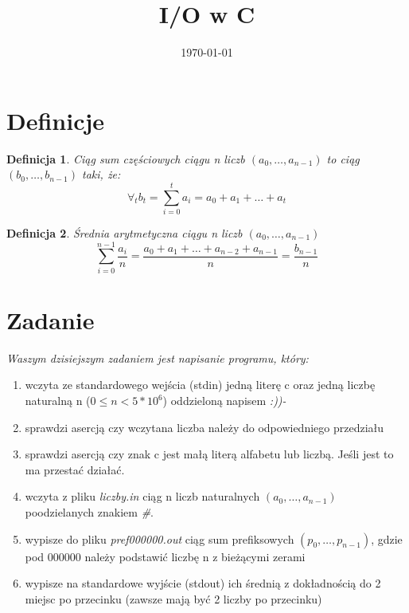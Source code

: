 \documentclass[paper=a4, fontsize=11pt]{article}
\title{	
\huge I/O w C
}
\date{\normalsize\today}
\begin{document}
\maketitle

\newtheorem{mydef}{Definicja}
\newtheorem{theorem}{Twierdzenie}
\newtheorem{lemma}{Lemat}

\section{Definicje}
\begin{mydef}Ciąg sum częściowych ciągu n liczb $(a_0, \dots, a_{n-1})$ to ciąg $(b_0, \dots, b_{n-1})$ taki, że:
\begin{displaymath}
	\forall_t b_t = \sum_{i=0}^{t} a_i = a_0 + a_1 + \dots + a_t
\end{displaymath}	

\end{mydef}

\begin{mydef}Średnia arytmetyczna ciągu n liczb $(a_0, \dots, a_{n-1})$
\begin{displaymath}
\sum_{i=0}^{n-1} \frac{a_i}{n} = \frac{a_0 + a_1 + \dots + a_{n-2} + a_{n-1}}{n} = \frac{b_{n-1}}{n}
\end{displaymath}

\section{Zadanie}
Waszym dzisiejszym zadaniem jest napisanie programu, który:


\end{mydef}

\begin{enumerate}
\item wczyta ze standardowego wejścia (stdin) jedną literę c oraz jedną liczbę naturalną n ($0 \le n < 5 * 10^6$) oddzieloną napisem \textit{:))-}
\item sprawdzi asercją czy wczytana liczba należy do odpowiedniego przedziału
\item sprawdzi asercją czy znak c jest małą literą alfabetu lub liczbą. Jeśli jest to ma przestać działać.
\item wczyta z pliku \textit{liczby.in} ciąg n liczb naturalnych $(a_0, \dots, a_{n-1})$ poodzielanych znakiem \textit{\#}.

\item wypisze do pliku \textit{pref000000.out} ciąg sum prefiksowych $(p_0, \dots, p_{n-1})$, gdzie pod 000000 należy podstawić liczbę n z bieżącymi zerami
\item wypisze na standardowe wyjście (stdout) ich średnią z dokładnością do 2 miejsc po przecinku (zawsze mają być 2 liczby po przecinku)
\end{enumerate}
\end{document}
